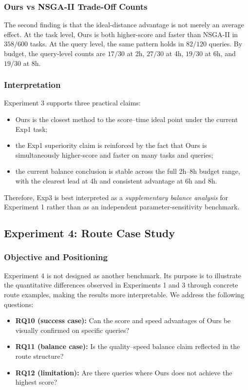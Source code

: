 \subsubsection{Ours vs NSGA-II Trade-Off Counts}
The second finding is that the ideal-distance advantage is not merely an average effect.
At the task level, Ours is both higher-score and faster than NSGA-II in \(358/600\) tasks.
At the query level, the same pattern holds in \(82/120\) queries.
By budget, the query-level counts are \(17/30\) at 2h, \(27/30\) at 4h,
\(19/30\) at 6h, and \(19/30\) at 8h.

\subsubsection{Interpretation}
Experiment 3 supports three practical claims:
\begin{itemize}[leftmargin=1.5em]
    \item Ours is the closest method to the score--time ideal point under the current Exp1 task;
    \item the Exp1 superiority claim is reinforced by the fact that Ours is simultaneously higher-score and faster on many tasks and queries;
    \item the current balance conclusion is stable across the full 2h--8h budget range, with the clearest lead at 4h and consistent advantage at 6h and 8h.
\end{itemize}
Therefore, Exp3 is best interpreted as a \emph{supplementary balance analysis}
for Experiment 1 rather than as an independent parameter-sensitivity benchmark.

\subsection{Experiment 4: Route Case Study}
\subsubsection{Objective and Positioning}
Experiment 4 is not designed as another benchmark.
Its purpose is to illustrate the quantitative differences observed in Experiments 1 and 3
through concrete route examples, making the results more interpretable.
We address the following questions:
\begin{itemize}[leftmargin=1.5em]
    \item \textbf{RQ10 (success case):} Can the score and speed advantages of Ours be visually confirmed on specific queries?
    \item \textbf{RQ11 (balance case):} Is the quality--speed balance claim reflected in the route structure?
    \item \textbf{RQ12 (limitation):} Are there queries where Ours does not achieve the highest score?
\end{itemize}

